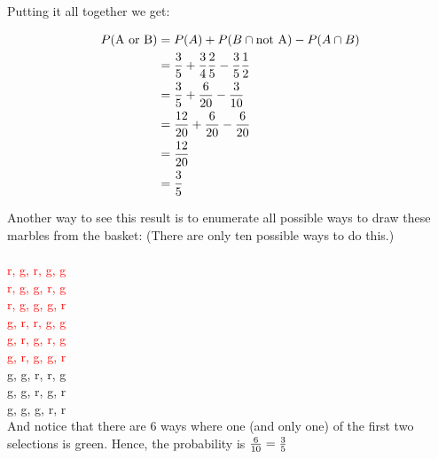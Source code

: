 Putting it all together we get:

  \begin{align}
   P(\text{A or B}) &= P(A) + P(B\cap  \text{not A}) - P(A \cap
                      B)\\\nonumber
                      &= {3\over 5} + {3\over 4}{2\over 5} - {3\over 5}{1\over 2}\\\nonumber
                      &= {3\over 5} + {6\over 20} - {3\over 10}\\\nonumber
                      &= {12\over 20} + {6\over 20} - {6\over 20}\\\nonumber
                      &= {12\over 20}\\\nonumber
                      &= {3\over 5}\nonumber
 \end{align}

 Another way to see this result is to enumerate all possible ways to
 draw these marbles from the basket: (There are only ten possible ways
 to do this.)\\

 
\\
 \textcolor{red}{r, g, r, g, g}\\
\textcolor{red} {r, g, g, r, g}\\
 \textcolor{red}{r, g, g, g, r}\\
 \textcolor{red}{g, r, r, g, g}\\
 \textcolor{red}{g, r, g, r, g}\\
 \textcolor{red}{g, r, g, g, r}\\
 {g, g, r, r, g}\\
 {g, g, r, g, r}\\
 {g, g, g, r, r}\\


 And notice that there are 6 ways where one (and only one) of the
 first two selections is green.  Hence, the probability is ${6\over
   10} = {3\over 5}$
